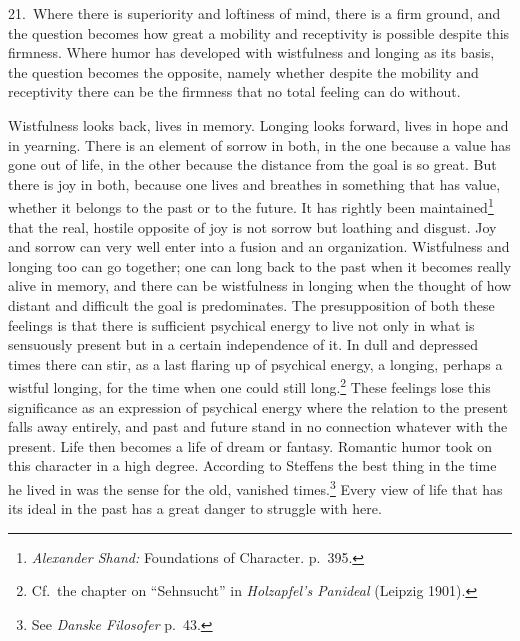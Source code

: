 \documentclass[12pt]{book}
\newcommand{\opage}[1]{\marginnote{\footnotesize\textit{[#1]}}}
\begin{document}
21.~Where there is superiority and loftiness of mind, there is a firm ground, and
the question becomes how great a mobility and receptivity is possible despite this
firmness. Where humor has developed with wistfulness and longing as its basis, the
question becomes the opposite, namely whether despite the mobility and receptivity
there can be the firmness that no total feeling can do without.

Wistfulness looks back, lives in memory. Longing looks forward, lives in hope and in
yearning. There is an element of sorrow in both, in the one because a value has gone
out of life, in the other because the distance from the goal is so great. But there is
joy in both, because one lives and breathes in something that has value, whether it
belongs to the past or to the future. It has rightly been maintained\footnote{%
\textit{Alexander Shand:} Foundations of Character. p.~395.} that the real, hostile
opposite of joy \opage{81}is not sorrow but loathing and disgust. Joy and sorrow can
very well enter into a fusion and an organization. Wistfulness and longing too can go
together; one can long back to the past when it becomes really alive in memory, and
there can be wistfulness in longing when the thought of how distant and difficult the
goal is predominates. The presupposition of both these feelings is that there is
sufficient psychical energy to live not only in what is sensuously present but in a
certain independence of it. In dull and depressed times there can stir, as a last
flaring up of psychical energy, a longing, perhaps a wistful longing, for the time when
one could still long.\footnote{Cf.\ the chapter on ``Sehnsucht'' in
\textit{Holzapfel's Panideal} (Leipzig 1901).} These feelings lose this significance
as an expression of psychical energy where the relation to the present falls away
entirely, and past and future stand in no connection whatever with the present. Life
then becomes a life of dream or fantasy. Romantic humor took on this character in a
high degree. According to Steffens the best thing in the time he lived in was the sense
for the old, vanished times.\footnote{See \textit{Danske Filosofer} p.~43.} Every
view of life that has its ideal in the past has a great danger to struggle with here.
\end{document}
